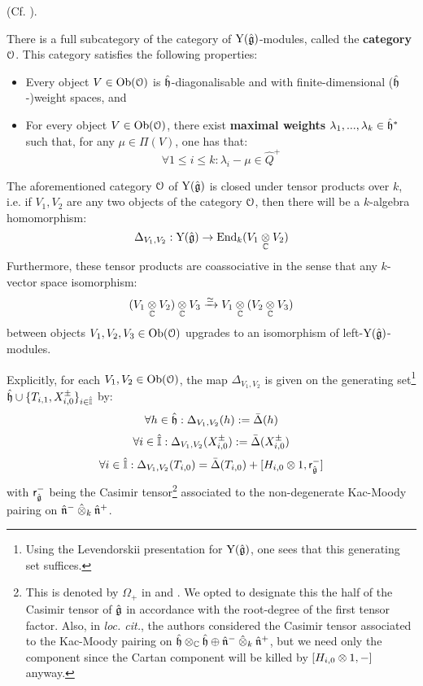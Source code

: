         \begin{lemma} \label{lemma: category_O_affine_yangian}
            (Cf. \cite[Theorem 4.9]{guay_nakajima_wendlandt_affine_yangian_coproduct}).
        
            There is a full subcategory of the category of $\mathrm{Y}(\hat{\mathfrak{g}})$-modules, called the \textbf{category $\mathcal{O}$}. This category satisfies the following properties:
            \begin{itemize}
                \item Every object $V \in \mathrm{Ob}(\mathcal{O})$ is $\hat{\mathfrak{h}}$-diagonalisable and with finite-dimensional ($\hat{\mathfrak{h}}$-)weight spaces, and
                \item For every object $V \in \mathrm{Ob}(\mathcal{O})$, there exist \textbf{maximal weights} $\lambda_1, ..., \lambda_k \in \hat{\mathfrak{h}}^*$ such that, for any $\mu \in \Pi(V)$, one has that:
                    $$\forall 1 \leq i \leq k: \lambda_i - \mu \in \hat{Q}^+$$
            \end{itemize}

            The aforementioned category $\mathcal{O}$ of $\mathrm{Y}(\hat{\mathfrak{g}})$ is closed under tensor products over $k$, i.e. if $V_1, V_2$ are any two objects of the category $\mathcal{O}$, then there will be a $k$-algebra homomorphism:
                $$\Delta_{V_1, V_2}: \rmY(\hat{\g}) \to \End_k(V_1 \tensor_{\bbC} V_2)$$
            Furthermore, these tensor products are coassociative in the sense that any $k$-vector space isomorphism:
                $$(V_1 \tensor_{\bbC} V_2) \tensor_{\bbC} V_3 \xrightarrow[]{\cong} V_1 \tensor_{\bbC} (V_2 \tensor_{\bbC} V_3)$$
            between objects $V_1, V_2, V_3 \in \mathrm{Ob}(\mathcal{O})$ upgrades to an isomorphism of left-$\mathrm{Y}(\hat{\mathfrak{g}})$-modules.

            Explicitly, for each $V_1, V_2 \in \mathrm{Ob}(\mathcal{O})$, the map $\Delta_{V_1, V_2}$ is given on the generating set\footnote{Using the Levendorskii presentation for $\mathrm{Y}(\hat{\mathfrak{g}})$, one sees that this generating set suffices.} $\hat{\mathfrak{h}} \cup \{T_{i, 1}, X_{i, 0}^{\pm}\}_{i \in \hat{\mathbb{I}}}$ by:
                $$\forall h \in \hat{\mathfrak{h}}: \Delta_{V_1, V_2}(h) := \bar{\Delta}(h)$$
                $$\forall i \in \hat{\mathbb{I}}: \Delta_{V_1, V_2}(X_{i, 0}^{\pm}) := \bar{\Delta}(X_{i, 0}^{\pm})$$
                $$\forall i \in \hat{\simpleroots}: \Delta_{V_1, V_2}(T_{i, 0}) = \bar{\Delta}(T_{i, 0}) + [H_{i, 0} \tensor 1, \sfr_{ \hat{\g} }^-]$$
            with $\mathsf{r}_{ \hat{\mathfrak{g}} }^-$ being the Casimir tensor\footnote{This is denoted by $\Omega_+$ in \cite{guay_nakajima_wendlandt_affine_yangian_coproduct} and \cite{guay_nakajima_wendlandt_affine_yangian_vertex_representations_and_PBW}. We opted to designate this the  half of the Casimir tensor of $\hat{\mathfrak{g}}$ in accordance with the root-degree of the first tensor factor. Also, in \textit{loc. cit.}, the authors considered the Casimir tensor associated to the Kac-Moody pairing on $\hat{\h} \tensor_{\bbC} \hat{\h} \oplus \hat{\n}^- \hattensor_k \hat{\n}^+$, but we need only the  component since the Cartan component will be killed by $[H_{i, 0} \tensor 1, -]$ anyway.} associated to the non-degenerate Kac-Moody pairing on $\hat{\n}^- \hattensor_k \hat{\n}^+$.
        \end{lemma}
